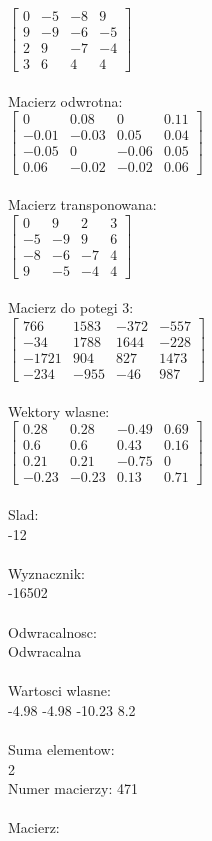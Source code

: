 \documentclass[a4paper,12pt]{article}
\begin{document}
$\begin{bmatrix} 0&-5&-8&9\\9&-9&-6&-5\\2&9&-7&-4\\3&6&4&4 \end{bmatrix}$
\\
\\
Macierz odwrotna:\\

$\begin{bmatrix} 0&0.08&0&0.11\\-0.01&-0.03&0.05&0.04\\-0.05&0&-0.06&0.05\\0.06&-0.02&-0.02&0.06 \end{bmatrix}$
\\
\\
Macierz transponowana:\\

$\begin{bmatrix} 0&9&2&3\\-5&-9&9&6\\-8&-6&-7&4\\9&-5&-4&4 \end{bmatrix}$
\\
\\
Macierz do potegi 3:\\

$\begin{bmatrix} 766&1583&-372&-557\\-34&1788&1644&-228\\-1721&904&827&1473\\-234&-955&-46&987 \end{bmatrix}$
\\
\\
Wektory wlasne:\\

$\begin{bmatrix} 0.28&0.28&-0.49&0.69\\0.6&0.6&0.43&0.16\\0.21&0.21&-0.75&0\\-0.23&-0.23&0.13&0.71 \end{bmatrix}$
\\
\\
Slad:\\
-12
\\
\\
Wyznacznik:\\
-16502
\\
\\
Odwracalnosc:\\
Odwracalna
\\
\\
Wartosci wlasne:\\
-4.98 -4.98 -10.23 8.2
\\
\\
Suma elementow:\\
2
\\
\newpage
Numer macierzy:
471
\\
\\
Macierz:\\
\end{document}
